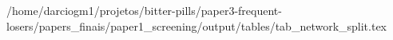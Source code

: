 /home/darciogm1/projetos/bitter-pills/paper3-frequent-losers/papers_finais/paper1_screening/output/tables/tab_network_split.tex